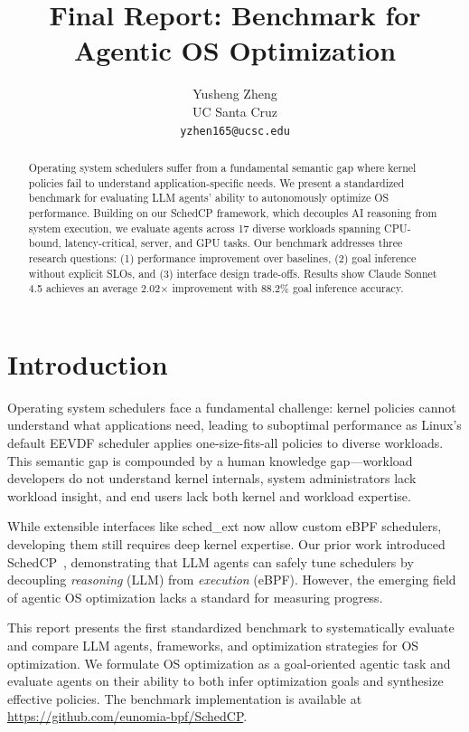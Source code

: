\documentclass{article}
\title{Final Report: Benchmark for Agentic OS Optimization}
\author{
  Yusheng Zheng \\
  UC Santa Cruz \\
  \texttt{yzhen165@ucsc.edu}
}
\newcommand{\sys}{SchedCP\xspace}
\begin{document}
\maketitle

\begin{abstract}
Operating system schedulers suffer from a fundamental semantic gap where kernel policies fail to understand application-specific needs. We present a standardized benchmark for evaluating LLM agents' ability to autonomously optimize OS performance. Building on our \sys framework, which decouples AI reasoning from system execution, we evaluate agents across 17 diverse workloads spanning CPU-bound, latency-critical, server, and GPU tasks. Our benchmark addresses three research questions: (1) performance improvement over baselines, (2) goal inference without explicit SLOs, and (3) interface design trade-offs. Results show Claude Sonnet 4.5 achieves an average 2.02$\times$ improvement with 88.2\% goal inference accuracy.
\end{abstract}

\section{Introduction}

Operating system schedulers face a fundamental challenge: kernel policies cannot understand what applications need, leading to suboptimal performance as Linux's default EEVDF scheduler applies one-size-fits-all policies to diverse workloads. This semantic gap is compounded by a human knowledge gap---workload developers do not understand kernel internals, system administrators lack workload insight, and end users lack both kernel and workload expertise.

While extensible interfaces like sched\_ext now allow custom eBPF schedulers, developing them still requires deep kernel expertise. Our prior work introduced \sys~\cite{schedcp2025}, demonstrating that LLM agents can safely tune schedulers by decoupling \emph{reasoning} (LLM) from \emph{execution} (eBPF). However, the emerging field of agentic OS optimization lacks a standard for measuring progress.

This report presents the first standardized benchmark to systematically evaluate and compare LLM agents, frameworks, and optimization strategies for OS optimization. We formulate OS optimization as a goal-oriented agentic task and evaluate agents on their ability to both infer optimization goals and synthesize effective policies. The benchmark implementation is available at \url{https://github.com/eunomia-bpf/SchedCP}.
\end{document}
